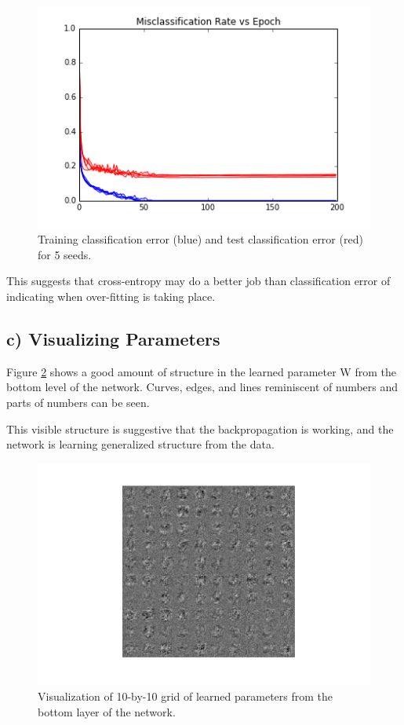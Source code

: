 \documentclass{article}
\begin{document}
\begin{figure}[h]
  \centering 
  \includegraphics[scale=0.6]{../5b_misclassification_vs_epoch_200.png} 
  \caption{Training classification error (blue) and test classification error (red) for 5 seeds.}
  \label{fig:class1}
\end{figure}

This suggests that cross-entropy may do a better job than classification error of indicating when over-fitting is taking place. 


\subsection{c) Visualizing Parameters}

Figure \ref{fig:paramviz} shows a good amount of structure in the learned parameter W from the bottom level of the network. Curves, edges, and lines reminiscent of numbers and parts of numbers can be seen. 

This visible structure is suggestive that the backpropagation is working, and the network is learning generalized structure from the data. 

\begin{figure}[h]
  \centering
  \includegraphics[scale=0.7]{../5c_parameter_viz.png} 
  \caption{Visualization of 10-by-10 grid of learned parameters from the bottom layer of the network.}
  \label{fig:paramviz}
\end{figure}
\end{document}
